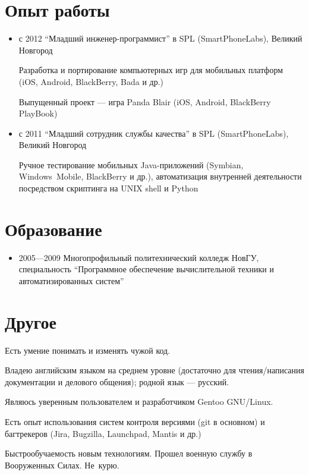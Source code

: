 \section{Опыт работы}
\begin{itemize}
\item с 2012 ``Младший инженер-программист'' в SPL (SmartPhoneLabs),
Великий Новгород

Разработка и портирование компьютерных игр для мобильных платформ
(iOS, Android, BlackBerry, Bada и др.)

Выпущенный проект --- игра Panda Blair (iOS, Android, BlackBerry PlayBook)

\item с 2011 ``Младший сотрудник службы качества'' в SPL (SmartPhoneLabs),
Великий Новгород

Ручное тестирование мобильных Java-приложений
(Symbian, Windows~Mobile, BlackBerry и др.),
автоматизация внутренней деятельности посредством скриптинга на UNIX shell
и Python
\end{itemize}

\section{Образование}
\begin{itemize}
\item 2005---2009 Многопрофильный политехнический колледж НовГУ, специальность
``Программное обеспечение вычислительной техники и автоматизированных систем''
\end{itemize}

\section{Другое}
Есть умение понимать и изменять чужой код.

Владею английским языком на среднем уровне (достаточно для чтения/написания
документации и делового общения); родной язык --- русский.

Являюсь уверенным пользователем и разработчиком Gentoo GNU/Linux.

Есть опыт использования систем контроля версиями (git в основном) и
багтрекеров (Jira, Bugzilla, Launchpad, Mantis и др.)

Быстрообучаемость новым технологиям.
Прошел военную службу в Вооруженных Силах.
Не~курю.
